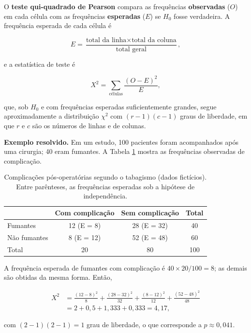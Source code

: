 \documentclass[
]{book}
\begin{document}
O \textbf{teste qui-quadrado de Pearson} compara as frequências \textbf{observadas} (\(O\)) em cada célula com as frequências \textbf{esperadas} (\(E\)) se \(H_0\) fosse verdadeira. A frequência esperada de cada célula é

\[
E = \frac{\text{total da linha} \times \text{total da coluna}}{\text{total geral}},
\]

e a estatística de teste é

\[
X^2 = \sum_{\text{células}} \frac{(O - E)^2}{E},
\]

que, sob \(H_0\) e com frequências esperadas suficientemente grandes, segue aproximadamente a distribuição \(\chi^2\) com \((r - 1)(c - 1)\) graus de liberdade, em que \(r\) e \(c\) são os números de linhas e de colunas.

\textbf{Exemplo resolvido.} Em um estudo, 100 pacientes foram acompanhados após uma cirurgia; 40 eram fumantes. A Tabela \ref{tab:inf-quiq-tab} mostra as frequências observadas de complicação.

\begin{table}

\caption{\label{tab:inf-quiq-tab}Complicações pós-operatórias segundo o tabagismo (dados fictícios). Entre parênteses, as frequências esperadas sob a hipótese de independência.}
\centering
\begin{tabular}[t]{l|c|c|c}
\hline
 & Com complicação & Sem complicação & Total\\
\hline
Fumantes & 12 (E = 8) & 28 (E = 32) & 40\\
\hline
Não fumantes & 8 (E = 12) & 52 (E = 48) & 60\\
\hline
Total & 20 & 80 & 100\\
\hline
\end{tabular}
\end{table}

A frequência esperada de fumantes com complicação é \(40 \times 20/100 = 8\); as demais são obtidas da mesma forma. Então,

\[
\begin{aligned}
X^2 &= \frac{(12 - 8)^2}{8} + \frac{(28 - 32)^2}{32} + \frac{(8 - 12)^2}{12} + \frac{(52 - 48)^2}{48} \\
    &= 2 + 0{,}5 + 1{,}333 + 0{,}333 = 4{,}17,
\end{aligned}
\]

com \((2 - 1)(2 - 1) = 1\) grau de liberdade, o que corresponde a \(p \approx 0{,}041\).
\end{document}
